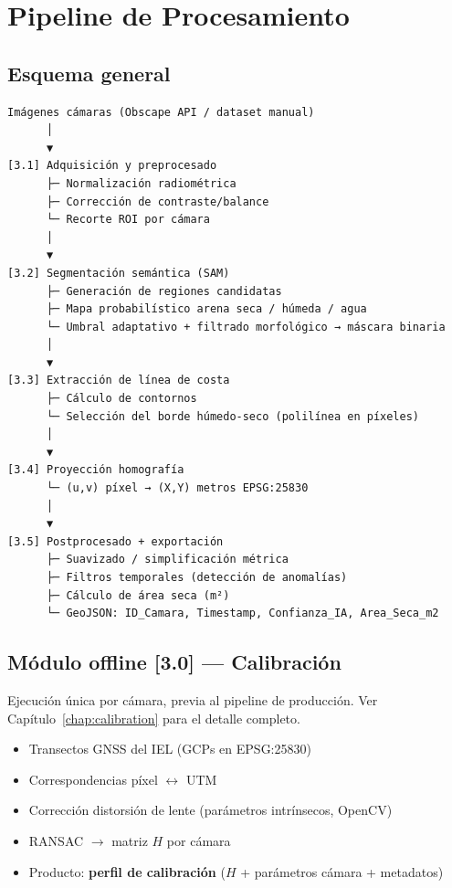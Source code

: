 \chapter{Pipeline de Procesamiento}

\section{Esquema general}

\begin{Verbatim}
Imágenes cámaras (Obscape API / dataset manual)
      │
      ▼
[3.1] Adquisición y preprocesado
      ├─ Normalización radiométrica
      ├─ Corrección de contraste/balance
      └─ Recorte ROI por cámara
      │
      ▼
[3.2] Segmentación semántica (SAM)
      ├─ Generación de regiones candidatas
      ├─ Mapa probabilístico arena seca / húmeda / agua
      └─ Umbral adaptativo + filtrado morfológico → máscara binaria
      │
      ▼
[3.3] Extracción de línea de costa
      ├─ Cálculo de contornos
      └─ Selección del borde húmedo-seco (polilínea en píxeles)
      │
      ▼
[3.4] Proyección homografía
      └─ (u,v) píxel → (X,Y) metros EPSG:25830
      │
      ▼
[3.5] Postprocesado + exportación
      ├─ Suavizado / simplificación métrica
      ├─ Filtros temporales (detección de anomalías)
      ├─ Cálculo de área seca (m²)
      └─ GeoJSON: ID_Camara, Timestamp, Confianza_IA, Area_Seca_m2
\end{Verbatim}

\section{Módulo offline [3.0] --- Calibración}

Ejecución única por cámara, previa al pipeline de producción.
Ver Capítulo~\ref{chap:calibration} para el detalle completo.

\begin{itemize}
  \item Transectos GNSS del IEL (GCPs en EPSG:25830)
  \item Correspondencias píxel $\leftrightarrow$ UTM
  \item Corrección distorsión de lente (parámetros intrínsecos, OpenCV)
  \item RANSAC $\to$ matriz $H$ por cámara
  \item Producto: \textbf{perfil de calibración} ($H$ + parámetros cámara + metadatos)
\end{itemize}

